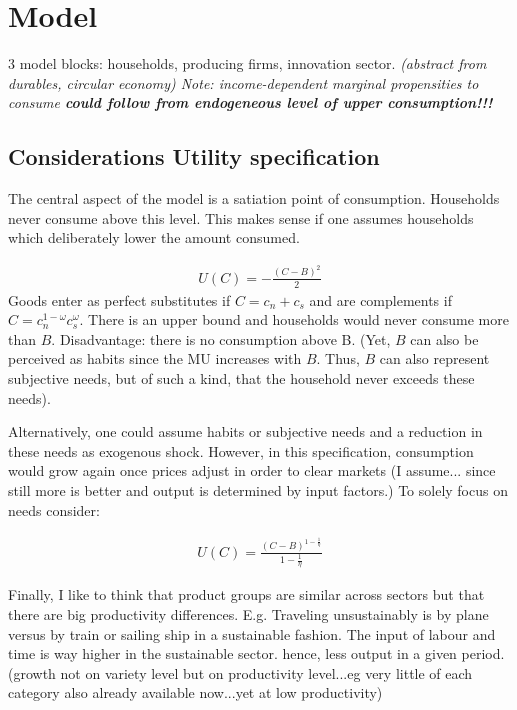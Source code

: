 \section{Model}

3 model blocks: households, producing firms, innovation sector.
\textit{(abstract from durables, circular economy) Note: income-dependent marginal propensities to consume \textbf{could follow from endogeneous level of upper consumption!!!} }


\subsection{Considerations Utility specification}
The central aspect of the model is a satiation point of consumption. Households never consume above this level. This makes sense if one assumes households which deliberately lower the amount consumed. 

\begin{align*}
U(C)= -\frac{(C-B)^2}{2} 
\end{align*}
Goods enter as perfect substitutes if $C=c_n+c_s$ and are complements if $C=c_n^{1-\omega}c_s^\omega$.
 There is an upper bound and households would never consume more than $B$. Disadvantage: there is no consumption above B.  (Yet, $B$ can also be perceived as habits since the MU increases with $B$. Thus, $B$ can also represent subjective needs, but of such a kind, that the household never exceeds these needs). 


Alternatively, one could assume habits or subjective needs and a reduction in these needs as exogenous shock. However, in this specification, consumption would grow again once prices adjust in order to clear markets (I assume... since still more is better and output is determined by input factors.)
To solely focus on needs consider:

\begin{align*}
	U(C)= \frac{(C-B)^{1-\frac{1}{\eta}}}{1-\frac{1}{\eta}}
\end{align*}


Finally, I like to think that product groups are similar across sectors but that there are big productivity differences. E.g. Traveling unsustainably is by plane versus by train or sailing ship in a sustainable fashion. The input of labour and time is way higher in the sustainable sector. hence, less output in a given period. (growth not on variety level but on productivity level...eg very little of each category also already available now...yet at low productivity)


